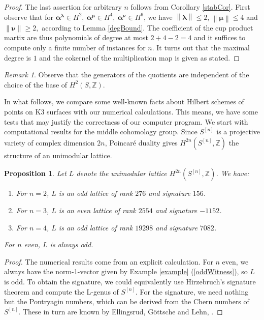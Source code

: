 \documentclass{amsart}
\newcommand{\hilb}[1]{^{[#1]}}
\newcommand{\IZ}{\mathbb{Z}}
\theoremstyle{plain}
\newtheorem{proposition}[theorem]{Proposition}
\theoremstyle{definition}
\theoremstyle{remark}
\newtheorem{remark}[theorem]{Remark}
\begin{document}
\begin{proof} The last assertion for arbitrary $n$ follows from Corollary \ref{stabCor}. First observe that for $\boldsymbol{\alpha}^{\boldsymbol{\lambda}}\!\in\! H^2,\  \boldsymbol{\alpha}^{\boldsymbol{\mu}}\!\in\! H^4,\  \boldsymbol{\alpha}^{\boldsymbol{\nu}}\!\in\! H^6 $, we have $\left\| \boldsymbol\lambda\right\| \leq 2$, $\left\| \boldsymbol\mu\right\| \leq 4$ and $\left\| \boldsymbol\nu\right\| \geq 2,$ according to Lemma \ref{degBound}.
The coefficient of the cup product martix are thus polynomials of degree at most $2+4-2 =4$ and it suffices to compute only a finite number of instances for $n$. It turns out that the maximal degree is $1$ and the cokernel of the multiplication map is given as stated.
\end{proof}
\begin{remark}
Observe that the generators of the quotients are independent of the choice of the base of $H^2(S,\IZ)$.
\end{remark}

In what follows, we compare some well-known facts about Hilbert schemes of points on K3 surfaces with our numerical calculations. This means, we have some tests that may justify the correctness of our computer program.
We start with computational results for the middle cohomology group. Since $S\hilb{n}$ is a projective variety of complex dimension $2n$, Poincar\'{e} duality gives $H^{2n}(S\hilb{n},\IZ)$ the structure of an unimodular lattice.  
\begin{proposition} Let $L$ denote the unimodular lattice $H^{2n}(S\hilb{n},\IZ)$. We have:
\begin{enumerate}
\item For $n=2$, $L$ is an odd lattice of rank $276$ and signature $156$.
\item For $n=3$, $L$ is an even lattice of rank $2554$ and signature $-1152$.
\item For $n=4$, $L$ is an odd lattice of rank $19298$ and signature $7082$.
\end{enumerate}
For $n$ even, $L$ is always odd. 
\end{proposition} 
\begin{proof}The numerical results come from an explicit calculation. For $n$ even, we always have the norm-1-vector given by Example \ref{example} (\ref{oddWitness}), so $L$ is odd. To obtain the signature, we could equivalently use Hirzebruch's signature theorem and compute the L-genus of $S\hilb{n}$. For the signature, we need nothing but the Pontryagin numbers, which can be derived from the Chern numbers of $S\hilb{n}$. These in turn are known by Ellingsrud, G\"ottsche and Lehn, \cite[Rem. 5.5]{EGL}. 
\end{proof}





\end{document}
